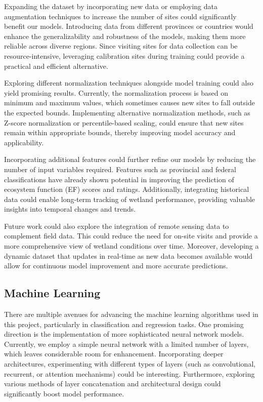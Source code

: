 \documentclass[12pt,letterpaper]{article}
\begin{document}
Expanding the dataset by incorporating new data or employing data augmentation techniques to increase the number of sites could significantly benefit our models.
Introducing data from different provinces or countries would enhance the generalizability and robustness of the models, making them more reliable across diverse regions.
Since visiting sites for data collection can be resource-intensive, leveraging calibration sites during training could provide a practical and efficient alternative.

Exploring different normalization techniques alongside model training could also yield promising results.
Currently, the normalization process is based on minimum and maximum values, which sometimes causes new sites to fall outside the expected bounds. Implementing alternative normalization methods, such as Z-score normalization or percentile-based scaling, could ensure that new sites remain within appropriate bounds, thereby improving model accuracy and applicability.

Incorporating additional features could further refine our models by reducing the number of input variables required.
Features such as provincial and federal classifications have already shown potential in improving the prediction of ecosystem function (\ac{EF}) scores and ratings.
Additionally, integrating historical data could enable long-term tracking of wetland performance, providing valuable insights into temporal changes and trends.

Future work could also explore the integration of remote sensing data to complement field data.
This could reduce the need for on-site visits and provide a more comprehensive view of wetland conditions over time.
Moreover, developing a dynamic dataset that updates in real-time as new data becomes available would allow for continuous model improvement and more accurate predictions.

\subsection{Machine Learning}

There are multiple avenues for advancing the machine learning algorithms used in this project, particularly in classification and regression tasks.
One promising direction is the implementation of more sophisticated neural network models.
Currently, we employ a simple neural network with a limited number of layers, which leaves considerable room for enhancement.
Incorporating deeper architectures, experimenting with different types of layers (such as convolutional, recurrent, or attention mechanisms) could be interesting.
Furthermore, exploring various methods of layer concatenation and architectural design could significantly boost model performance.
\end{document}
